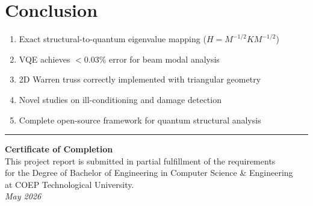 \documentclass[12pt, a4paper]{article}
\begin{document}
\section{Conclusion}

\begin{enumerate}[noitemsep]
    \item Exact structural-to-quantum eigenvalue mapping ($H = M^{-1/2} K M^{-1/2}$)
    \item VQE achieves $< 0.03\%$ error for beam modal analysis
    \item 2D Warren truss correctly implemented with triangular geometry
    \item Novel studies on ill-conditioning and damage detection
    \item Complete open-source framework for quantum structural analysis
\end{enumerate}

\vspace{1cm}
\noindent\rule{\textwidth}{0.4pt}

\begin{center}
    {\large \textbf{Certificate of Completion}}\\[0.5cm]
    This project report is submitted in partial fulfillment of the requirements\\
    for the Degree of Bachelor of Engineering in Computer Science \& Engineering\\
    at COEP Technological University.\\[1cm]
    \textit{May 2026}
\end{center}
\end{document}
